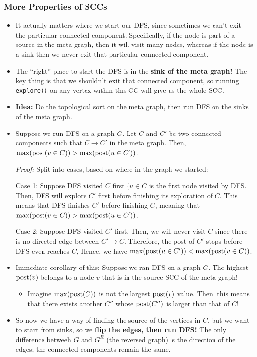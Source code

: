 	\subsubsection{More Properties of SCCs}
	\begin{itemize}
		\item It actually matters where we start our DFS, since sometimes we can't exit the particular 
			connected component. Specifically, if the node is part of a source in the meta graph, then 
			it will visit many nodes, whereas if the node is a sink then we never exit that particular connected
			component.
		\item The ``right'' place to start the DFS is in the \textbf{sink of the meta graph!} The key 
			thing is that we shouldn't exit that connected component, so running \texttt{explore()} on 
			any vertex within this CC will give us the whole SCC.
		\item \textbf{Idea:} Do the topological sort on the meta graph, then run DFS on the sinks of 
			the meta graph.
		\item Suppose we run DFS on a graph $G$. Let $C$ and $C'$ be two connected components such that $C \to 
			C'$ in the meta graph. Then, $\max(\mathrm{post}(v \in C)) > \max(\mathrm{post}(u \in C'))$.

			\textit{Proof:} Split into cases, based on where in the graph we started:

			Case 1: Suppose DFS visited $C$ first ($u \in C$ is the first node visited by DFS. Then, 
			DFS will explore $C'$ first before finishing its exploration of $C$. This means that DFS finishes
			$C'$ before finishing $C$, meaning that $\max(\mathrm{post}(v \in C)) > \max(\mathrm{post}(u \in C'))$.

			Case 2: Suppose DFS visited $C'$ first. Then, we will never visit $C$ since there is no directed
			edge between $C' \to C$. Therefore, the post of $C'$ stops before DFS even reaches $C$, Hence, 
			we have $\max(\mathrm{post}(u \in C')) < \max(\mathrm{post}(v \in C))$. 
		\item Immediate corollary of this: Suppose we ran DFS on a graph $G$. The highest $\mathrm{post}(v)$ belongs 
			to a node $v$ that is in the source SCC of the meta graph!
			\begin{itemize}
				\item Imagine $\max(\mathrm{post}(C))$ is not the largest $\mathrm{post}(v)$ value. Then, this means that 
					there exists another $C''$ whose $\mathrm{post}(C'')$ is larger than that of $C$!
			\end{itemize}
		\item So now we have a way of finding the source of the vertices in $C$, but we want to start from 
			sinks, so we \textbf{flip the edges, then run DFS!} The only difference betweeh $G$ and $G^R$ (the 
			reversed graph) is the direction of the edges; the connected components remain the same.


	\end{itemize}

